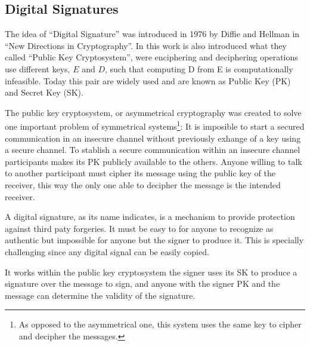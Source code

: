 \subsection{Digital Signatures}
The idea of ``Digital Signature'' was introduced in 1976 by Diffie and
  Hellman in ``New Directions in Cryptography''\cite{diffie1976new}. In this
  work is also introduced what they called ``Public Key Cryptosystem'', were
  enciphering and deciphering operations use different keys, $E$ and $D$, such
  that computing D from E is computationally infeasible. Today this pair are
  widely used and are known as Public Key (PK) and Secret Key (SK).

The public key cryptosystem, or asymmetrical cryptography was created to solve
  one important problem of symmetrical systems\footnote{As opposed to the
  asymmetrical one, this system uses the same key to cipher and decipher
  the messages.}: It is imposible to start a secured communication in an
  insecure channel without previously exhange of a key using a secure channel.
To stablish a secure communication within an insecure channel participants
  makes its PK publicly available to the others. Anyone willing to talk to
  another participant must cipher its message using the public key of the
  receiver, this way the only one able to decipher the message is the intended
  receiver.

A digital signature, as its name indicates, is a mechanism to provide protection
  against third paty forgeries. It must be easy to for anyone to recognize as
  authentic but impossible for anyone but the signer to produce it. This is
  specially challenging since any digital signal can be easily copied.

It works within the public key cryptosystem the signer uses its SK to produce
  a signature over the message to sign, and anyone with the signer PK and the
  message can determine the validity of the signature.
